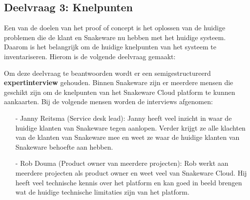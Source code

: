 \subsection{Deelvraag 3: Knelpunten}
Een van de doelen van het proof of concept is het oplossen van de huidige problemen die de klant en Snakeware nu hebben met het huidige systeem.
Daarom is het belangrijk om de huidige knelpunten van het systeem te inventariseren.
Hierom is de volgende deelvraag gemaakt:

\begin{center}
    \textit{\SubquestionThree}
\end{center}

\whitespace[0.2]
Om deze deelvraag te beantwoorden wordt er een semigestructureerd \textbf{expertinterview} gehouden.
Binnen Snakeware zijn er meerdere mensen die geschikt zijn om de knelpunten van het Snakeware Cloud platform te kunnen aankaarten.
Bij de volgende mensen worden de interviews afgenomen:
\begin{itemize}
    \item[-] Janny Reitsma (Service desk lead): Janny heeft veel inzicht in waar de huidige klanten van Snakeware tegen aanlopen.
        Verder krijgt ze alle klachten van de klanten van Snakeware mee en weet ze waar de huidige klanten van Snakeware behoefte aan hebben.
    \item[-] Rob Douma (Product owner van meerdere projecten): Rob werkt aan meerdere projecten als product owner en weet veel van Snakeware Cloud.
        Hij heeft veel technische kennis over het platform en kan goed in beeld brengen wat de huidige technische limitaties zijn van het platform.
\end{itemize}
%
